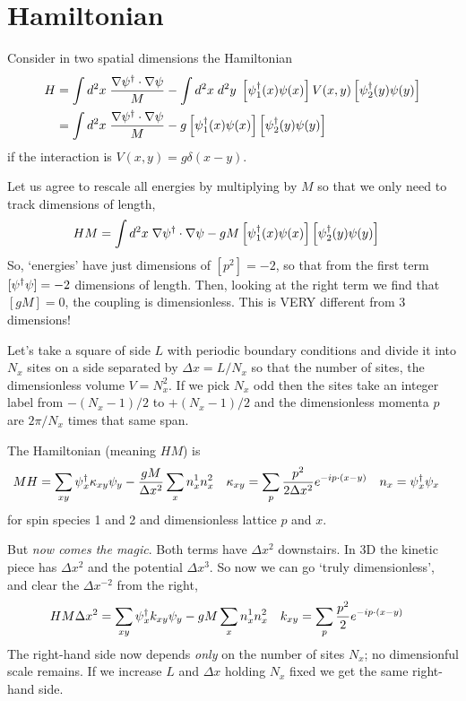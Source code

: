 \section{Hamiltonian}\label{sec:hamiltonian}

Consider in two spatial dimensions the Hamiltonian
\begin{align}
	H
	&= \int d^2x\; \frac{\nabla \psi{}^{\dagger} \cdot \nabla \psi}{M} - \int d^2x\; d^2y\; \left[\psi{}^{\dagger}_1(x) \psi(x)\right] V(x,y) \left[\psi{}^{\dagger}_2(y) \psi(y)\right]
	\\
	&= \int d^2x\; \frac{\nabla \psi{}^{\dagger} \cdot \nabla \psi}{M} - g \left[\psi{}^{\dagger}_1(x) \psi(x)\right] \left[\psi{}^{\dagger}_2(y) \psi(y)\right]
\end{align}
if the interaction is $V(x,y) = g \delta(x-y)$.

Let us agree to rescale all energies by multiplying by $M$ so that we only need to track dimensions of length,
\begin{align}
	HM
	&= \int d^2x\; \nabla \psi{}^{\dagger} \cdot \nabla \psi - gM \left[\psi{}^{\dagger}_1(x) \psi(x)\right] \left[\psi{}^{\dagger}_2(y) \psi(y)\right]
\end{align}
So, `energies' have just dimensions of $[p^2] = -2$, so that from the first term $[\psi{}^{\dagger}\psi] = -2$ dimensions of length.
Then, looking at the right term we find that $[gM] = 0$, the coupling is dimensionless.
This is VERY different from 3 dimensions!

Let's take a square of side $L$ with periodic boundary conditions and divide it into $N_x$ sites on a side separated by $\Delta x = L/N_x$ so that the number of sites, the dimensionless volume $V=N_x^2$.
If we pick $N_x$ odd then the sites take an integer label from $-(N_x-1)/2$ to $+(N_x-1)/2$ and the dimensionless momenta $p$ are $2\pi / N_x$ times that same span.

The Hamiltonian (meaning $HM$) is
\begin{align}
	MH &= \sum_{xy} \psi{}^{\dagger}_x \kappa_{xy} \psi_y - \frac{gM}{\Delta x^2} \sum_{x} n^1_x n^2_x
	&
	\kappa_{xy} &= \sum_{p} \frac{p^2}{2\Delta x^2} e^{-i p \cdot (x-y)}
	&
	n_x &= \psi{}^{\dagger}_x \psi_x
\end{align}
for spin species 1 and 2 and dimensionless lattice $p$ and $x$.

But \emph{now comes the magic}.
Both terms have $\Delta x^2$ downstairs.
In 3D the kinetic piece has $\Delta x^2$ and the potential $\Delta x^3$.
So now we can go `truly dimensionless', and clear the $\Delta x^{-2}$ from the right,
\begin{align}
	HM \Delta x^2
	&=
	\sum_{xy} \psi{}^{\dagger}_x k_{xy} \psi_y - gM \sum_x n^1_x n^2_x
	&
	k_{xy} &= \sum_{p} \frac{p^2}{2} e^{-i p \cdot (x-y)}
\end{align}
The right-hand side now depends \emph{only} on the number of sites $N_x$; no dimensionful scale remains.
If we increase $L$ and $\Delta x$ holding $N_x$ fixed we get the same right-hand side.

